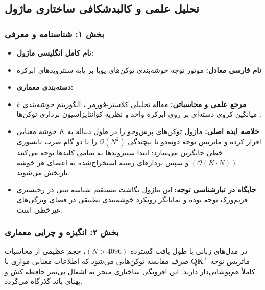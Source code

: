 \subsection{تحلیل علمی و کالبدشکافی ساختاری ماژول }
\label{sec:cluster}

\subsubsection*{بخش ۱: شناسنامه و معرفی }
\begin{itemize}
    \item \textbf{نام کامل انگلیسی ماژول:} 
    \item \textbf{نام فارسی معادل:} موتور توجه خوشه‌بندی توکن‌های پویا بر پایه سنترویدهای ابرکره 
    \item \textbf{دسته‌بندی معماری:} 
    \item \textbf{مرجع علمی و محاسباتی:} مقاله تحلیلی کلاستر-فورمر ، الگوریتم خوشه‌بندی $k$-میانگین کروی دسته‌ای بر روی ابرکره واحد و نظریه کوانتایزاسیون برداری توکن‌ها.
    \item \textbf{خلاصه ایده اصلی:} ماژول   توکن‌های پرس‌وجو را در طول دنباله به $K$ خوشه معنایی افراز کرده و ماتریس توجه دو‌به‌دو با پیچیدگی $\mathcal{O}(N^2)$ را با دو گام ضرب تانسوری خطی جایگزین می‌سازد: ابتدا سنترویدها به تمامی کلیدها توجه می‌کنند $(\mathcal{O}(K \cdot N))$ و سپس بردارهای زمینه استخراج‌شده به اعضای هر خوشه بازپخش می‌شوند.
    \item \textbf{جایگاه در تبارشناسی توجه:} این ماژول نگاشت مستقیم شناسه ثبتی  در رجیستری فریم‌ورک توجه بوده و نمایانگر رویکرد خوشه‌بندی تطبیقی در فضای ویژگی‌های غیرخطی است.
\end{itemize}

\subsubsection*{بخش ۲: انگیزه و چرایی معماری }
در مدل‌های زبانی با طول بافت گسترده $(N > 4096)$، حجم عظیمی از محاسبات ماتریس توجه $\mathbf{Q}\mathbf{K}^\top$ صرف مقایسه توکن‌هایی می‌شود که اطلاعات معنایی موازی یا کاملاً هم‌پوشانی‌دار دارند. این افزونگی ساختاری منجر به اشغال بی‌ثمر حافظه کش  و پهنای باند گذرگاه  می‌گردد.

